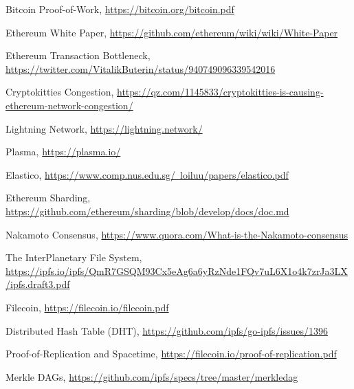 \documentclass[12pt]{article}
\begin{document}
\begin{thebibliography}{13}

Bitcoin Proof-of-Work, 
\href{https://bitcoin.org/bitcoin.pdf}{https://bitcoin.org/bitcoin.pdf}

Ethereum White Paper, 
\href{https://github.com/ethereum/wiki/wiki/White-Paper}{https://github.com/ethereum/wiki/wiki/White-Paper}

Ethereum Transaction Bottleneck, 
\href{https://twitter.com/VitalikButerin/status/940749096339542016}{https://twitter.com/VitalikButerin/status/940749096339542016}

Cryptokitties Congestion, 
\href{https://qz.com/1145833/cryptokitties-is-causing-ethereum-network-congestion/}{https://qz.com/1145833/cryptokitties-is-causing-ethereum-network-congestion/}

Lightning Network, 
\href{https://lightning.network/}{https://lightning.network/}

Plasma, 
\href{https://plasma.io/}{https://plasma.io/}

Elastico, 
\href{https://www.comp.nus.edu.sg/~loiluu/papers/elastico.pdf}{https://www.comp.nus.edu.sg/~loiluu/papers/elastico.pdf}

Ethereum Sharding, 
\href{https://github.com/ethereum/sharding/blob/develop/docs/doc.md}{https://github.com/ethereum/sharding/blob/develop/docs/doc.md}

Nakamoto Consensus, 
\href{https://www.quora.com/What-is-the-Nakamoto-consensus}{https://www.quora.com/What-is-the-Nakamoto-consensus}

The InterPlanetary File System, 
\href{https://ipfs.io/ipfs/QmR7GSQM93Cx5eAg6a6yRzNde1FQv7uL6X1o4k7zrJa3LX/ipfs.draft3.pdf}{https://ipfs.io/ipfs/QmR7GSQM93Cx5eAg6a6yRzNde1FQv7uL6X1o4k7zrJa3LX/ipfs.draft3.pdf}

Filecoin, 
\href{https://filecoin.io/filecoin.pdf}{https://filecoin.io/filecoin.pdf}

Distributed Hash Table (DHT), 
\href{https://github.com/ipfs/go-ipfs/issues/1396}{https://github.com/ipfs/go-ipfs/issues/1396}

Proof-of-Replication and Spacetime, 
\href{https://filecoin.io/proof-of-replication.pdf}{https://filecoin.io/proof-of-replication.pdf} 

Merkle DAGs,
\href{https://github.com/ipfs/specs/tree/master/merkledag}{https://github.com/ipfs/specs/tree/master/merkledag}

\end{thebibliography}
\end{document}
